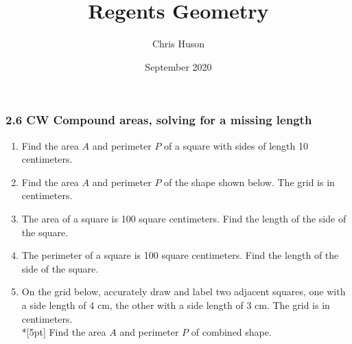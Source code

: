 \documentclass[12pt, twoside]{article}
\title{Regents Geometry}
\author{Chris Huson}
\date{September 2020}
\begin{document}
\subsubsection*{2.6 CW Compound areas, solving for a missing length}
\begin{enumerate}
  \item Find the area $A$ and perimeter $P$ of a square with sides of length 10 centimeters. \vspace{4cm}
    
  \item Find the area $A$ and perimeter $P$ of the shape shown below. The grid is in centimeters.
      \begin{flushleft}
      \end{flushleft}
        
  \item The area of a square is 100 square centimeters. Find the length of the side of the square. \vspace{3cm}
      
  \item The perimeter of a square is 100 square centimeters. Find the length of the side of the square.
  
      \newpage
  
  
  \item On the grid below, accurately draw and label two adjacent squares, one with a side length of 4 cm, the other with a side length of 3 cm. The grid is in centimeters.\\*[5pt]
      Find the area $A$ and perimeter $P$ of combined shape.
      \begin{flushleft}
      \end{flushleft}
  


\end{enumerate}
\end{document}

